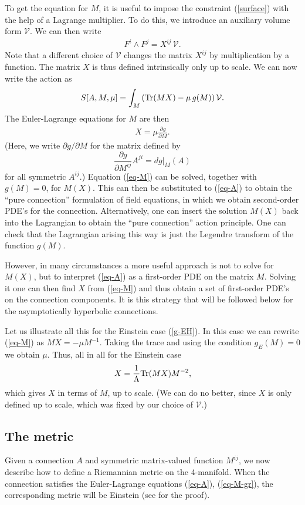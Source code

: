 \documentclass[a4paper,12pt]{article}
\newcommand{\be}{\begin{eqnarray}}
\newcommand{\ee}{\end{eqnarray}}
\begin{document}
To get the equation for $M$, it is useful to impose the constraint (\ref{surface}) with the help of a Lagrange multiplier. To do this, we introduce an auxiliary volume form ${\mathcal V}$. We can then write
\be\label{X}
F^i\wedge F^j = X^{ij} \,{\mathcal V}.
\ee
Note that a different choice of $\mathcal V$ changes the matrix $X^{ij}$ by multiplication by a function. The matrix $X$ is thus defined intrinsically only up to scale.
We can now write the action as
\be
S[A,M,\mu] = \int_M \left( {\rm Tr}(M X) - \mu \, g(M) \right) {\mathcal V}.
\ee
The Euler-Lagrange equations for $M$ are then
\be\label{eq-M}
X = \mu \frac{\partial g}{\partial M}.
\ee
(Here, we write $\partial g/\partial M$ for the matrix defined by
\[
\frac{\partial g}{\partial M^{ij}} A^{ji} = dg\Big|_{M}(A)
\]
for all symmetric $A^{ij}$.) Equation (\ref{eq-M}) can be solved, together with $g(M)=0$, for $M(X)$. This can then be substituted to (\ref{eq-A}) to obtain the ``pure connection'' formulation of field equations, in which we obtain second-order PDE's for the connection. Alternatively, one can insert the solution $M(X)$ back into the Lagrangian to obtain the ``pure connection'' action principle. One can check that the Lagrangian arising this way is just the Legendre transform of the function $g(M)$. 

However, in many circumstances a more useful approach is not to solve for $M(X)$, but to interpret (\ref{eq-A}) as a first-order PDE on the matrix $M$. Solving it one can then find $X$ from (\ref{eq-M}) and thus obtain a set of first-order PDE's on the connection components. It is this strategy that will be followed below for the asymptotically hyperbolic connections. 

Let us illustrate all this for the Einstein case (\ref{g-EH}). In this case we can rewrite (\ref{eq-M}) as $M X = - \mu M^{-1}$. Taking the trace and using the condition $g_E(M)=0$ we obtain $\mu$. Thus, all in all for the Einstein case
\be\label{eq-M-gr}
X = \frac{1}{\Lambda} {\rm Tr}(M X) M^{-2},
\ee
which gives $X$ in terms of $M$, up to scale. (We can do no better, since $X$ is only defined up to scale, which was fixed by our choice of $\mathcal V$.)

\subsection{The metric}

Given a connection $A$ and symmetric matrix-valued function $M^{ij}$, we now describe how to define a Riemannian metric on the 4-manifold. When the connection satisfies the Euler-Lagrange equations (\ref{eq-A}), (\ref{eq-M-gr}), the corresponding metric will be Einstein (see \cite{Herfray:2015fpa} for the proof).
\end{document}
